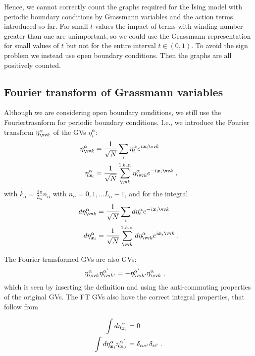 Hence, we cannot correctly count the graphs required for the Ising model with periodic boundary conditions by Grassmann variables and the action terms introduced so far.
For small $t$ values the impact of terms with winding number greater than one are unimportant, so we could use the Grassmann representation for small values of $t$ but not for the entire
interval $t\in(0,1)$. To avoid the sign problem we instead use open boundary conditions. Then
the graphs are all positively counted.



\subsection{Fourier transform of Grassmann variables} 
Although we are considering open boundary conditions, we still use the Fouriertrasnform
for periodic boundary conditions.
I.e., we  introduce the Fourier transform $\eta^{\alpha}_{\vv k}$ of the  GVs $\eta^{\alpha}_{i}$:
%
\begin{align}\label{eq:FT:GV}
 \eta^{\alpha}_{\vv k} &= \frac{1}{\sqrt{N}} \sum_{i}  \eta^{\alpha}_{i} e^{i \xx{i} \vv k}\\
  \eta^{\alpha}_{\xx{i}} &= \frac{1}{\sqrt{N}} \sum_{\vv k}^{1.b.z.}  \eta^{\alpha}_{\vv k} 
  e^{-i \xx{i} \vv k}\;,
\end{align}
%
with $k_{\alpha} = \frac{2\pi}{L_{\alpha}} n_{\alpha}$ with $n_{\alpha} = 0,1,\ldots L_{\alpha}-1$,
and for the integral
%
\begin{align}\label{eq:}
d \eta^{\alpha}_{\vv k} &= \frac{1}{\sqrt{N}} \sum_{i}  d\eta^{\alpha}_{i} e^{-i \xx{i} \vv k}\\
d  \eta^{\alpha}_{\xx{i}} &= \frac{1}{\sqrt{N}} \sum_{\vv k}^{1.b.z.}  d\eta^{\alpha}_{\vv k} 
  e^{i\xx{i} \vv k}\;.
\end{align}

The Fourier-transformed GVs are also GVs:
%
\begin{align}
 \eta^{\alpha}_{\vv k}  \eta^{\alpha'}_{\vv k'} 
 &= - \eta^{\alpha'}_{\vv k'}  \eta^{\alpha}_{\vv k}  \;,
\end{align}
%
which is seen by inserting the definition and using the anti-commuting properties of the
original GVs.
The FT GVs also have the correct integral properties, that follow from
%

\begin{subequations}
\begin{align}
\int d  \eta^{\alpha}_{\boldsymbol x_{i}} &= 0\label{eq:GV:int:a}\\
\int d  \eta^{\alpha}_{\boldsymbol x_{i}}\eta^{\alpha'}_{\boldsymbol x_{i'}} &= \delta_{\alpha\alpha'}\delta_{ii'}\;.
\label{eq:GV:int:b}
\end{align}
\end{subequations}

